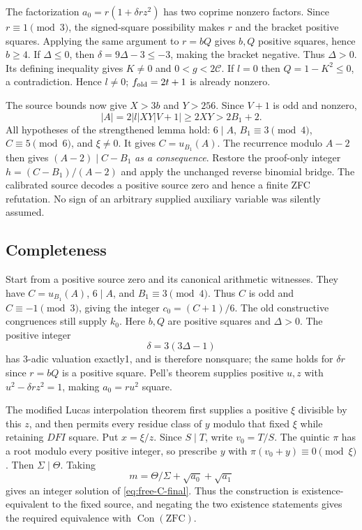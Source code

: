 The factorization $a_0=r(1+\delta r z^2)$ has two coprime nonzero factors.
Since $r\equiv1\pmod3$, the signed-square possibility makes $r$ and the
bracket positive squares. Applying the same argument to $r=bQ$ gives
$b,Q$ positive squares, hence $b\ge4$. If $\Delta\le0$, then
$\delta=9\Delta-3\le-3$, making the bracket negative. Thus
$\Delta>0$. Its defining inequality gives $K\ne0$ and $0<g<2\mathcal C$.
If $l=0$ then $Q=1-K^2\le0$, a contradiction. Hence $l\ne0$;
$f_{\rm old}=2t+1$ is already nonzero.

The source bounds now give $X>3b$ and $Y>256$. Since $V+1$ is odd and
nonzero,
\[
 |A|=2|l|XY|V+1|\ge2XY>2B_1+2.
\]
All hypotheses of the strengthened lemma hold: $6\mid A$,
$B_1\equiv3\pmod4$, $C\equiv5\pmod6$, and $\xi\ne0$.
It gives $C=u_{B_1}(A)$. The recurrence modulo $A-2$ then gives
$(A-2)\mid C-B_1$ \emph{as a consequence}. Restore the proof-only integer
$h=(C-B_1)/(A-2)$ and apply the unchanged reverse binomial bridge.
The calibrated source decodes a positive source zero and hence a finite
ZFC refutation. No sign of an arbitrary supplied auxiliary variable was
silently assumed.

\subsection{Completeness}

Start from a positive source zero and its canonical arithmetic witnesses.
They have $C=u_{B_1}(A)$, $6\mid A$, and $B_1\equiv3\pmod4$.
Thus $C$ is odd and $C\equiv-1\pmod3$, giving the integer
$c_0=(C+1)/6$. The old constructive congruences still supply $k_0$.
Here $b,Q$ are positive squares and $\Delta>0$.
The positive integer
\[
 \delta=3(3\Delta-1)
\]
has $3$-adic valuation exactly1, and is therefore nonsquare; the same holds
for $\delta r$ since $r=bQ$ is a positive square.
Pell's theorem supplies positive $u,z$ with
$u^2-\delta r z^2=1$, making $a_0=ru^2$ square.

The modified Lucas interpolation theorem first supplies a positive $\xi$
divisible by this $z$, and then permits every residue class of $y$ modulo
that fixed $\xi$ while retaining $DFI$ square. Put $x=\xi/z$.
Since $S\mid T$, write $v_0=T/S$. The quintic $\pi$ has a root modulo every
positive integer, so prescribe $y$ with $\pi(v_0+y)\equiv0\pmod\xi$.
Then $\Sigma\mid\Theta$. Taking
\[
 m=\Theta/\Sigma+\sqrt{a_0}+\sqrt{a_1}
\]
gives an integer solution of \eqref{eq:free-C-final}.
Thus the construction is existence-equivalent to the fixed source, and
negating the two existence statements gives the required equivalence with
$\operatorname{Con}(\mathrm{ZFC})$.

